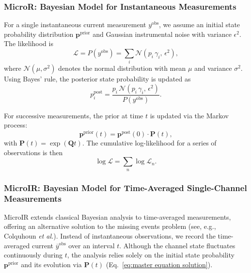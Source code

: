 \documentclass[pdflatex,sn-nature]{sn-jnl}%
\theoremstyle{thmstyleone}%
\theoremstyle{thmstyletwo}%
\theoremstyle{thmstylethree}%
\begin{document}
\subsubsection{MicroR: Bayesian Model for Instantaneous Measurements}

For a single instantaneous current measurement \(y^{\text{obs}}\), we assume an initial state probability distribution \(\boldsymbol{p}^{\text{prior}}\) and Gaussian instrumental noise with variance \(\epsilon^2\). The likelihood is
\begin{equation}
	\mathcal{L} = P(y^{\text{obs}}) = \sum_i \mathcal{N}(p_i\,\gamma_i,\,\epsilon^2),
	\label{eq:single_channel_likelihood_short}
\end{equation}
where \(\mathcal{N}(\mu,\sigma^2)\) denotes the normal distribution with mean \(\mu\) and variance \(\sigma^2\). Using Bayes' rule, the posterior state probability is updated as
\begin{equation}
	p^{\text{post}}_i = \frac{p_i\,\mathcal{N}(p_i\,\gamma_i,\,\epsilon^2)}{P(y^{\text{obs}})}.
	\label{eq:single_channel_posterior_short}
\end{equation}

For successive measurements, the prior at time \(t\) is updated via the Markov process:
\begin{equation}
	\boldsymbol{p}^{\text{prior}}(t) = \boldsymbol{p}^{\text{post}}(0) \cdot \boldsymbol{P}(t),
	\label{eq:prior_update_short}
\end{equation}
with \(\boldsymbol{P}(t)=\exp(\boldsymbol{Q}t)\). The cumulative log-likelihood for a series of observations is then
\begin{equation}
	\log \mathcal{L} = \sum_n \log \mathcal{L}_n.
	\label{eq:total_loglikelihood_short}
\end{equation}


\subsubsection{MicroIR: Bayesian Model for Time-Averaged Single-Channel Measurements}

MicroIR extends classical Bayesian analysis to time-averaged measurements, offering an alternative solution to the missing events problem (see, e.g., Colquhoun \textit{et al.}). Instead of instantaneous observations, we record the time-averaged current \(\overline{y}^{\text{obs}}\) over an interval \(t\). Although the channel state fluctuates continuously during \(t\), the analysis relies solely on the initial state probability \(\boldsymbol{p}^{\text{prior}}\) and its evolution via \(\mathbf{P}(t)\) (Eq.~\ref{eq:master equation solution}).
\end{document}
